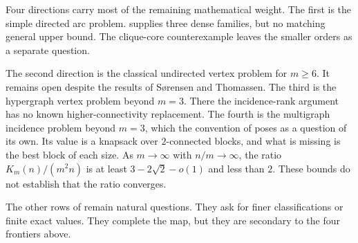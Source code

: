 Four directions carry most of the remaining mathematical weight.
The first is the simple directed arc problem.
 supplies three dense families, but no matching general upper bound.
The clique-core counterexample leaves the smaller orders as a separate question.

The second direction is the classical undirected vertex problem for $m\ge6$.
It remains open despite the results of S{\o}rensen and Thomassen.
The third is the hypergraph vertex problem beyond $m=3$.
There the incidence-rank argument has no known higher-connectivity replacement.
The fourth is the multigraph incidence problem beyond $m=3$, which the convention
of  poses as a question of its own.
Its value is a knapsack over $2$-connected blocks, and what is missing is the
best block of each size. As $m\to\infty$ with $n/m\to\infty$, the ratio
$K_m(n)/(m^2n)$ is at least $3-2\sqrt{2}-o(1)$ and less than $2$.
These bounds do not establish that the ratio converges.

The other rows of  remain natural questions.
They ask for finer classifications or finite exact values.
They complete the map, but they are secondary to the four frontiers above.


